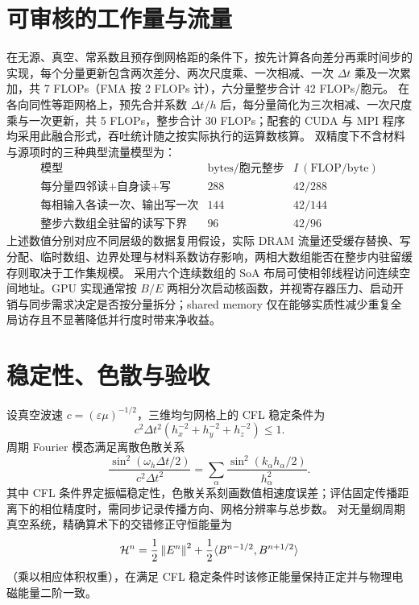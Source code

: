 \section{可审核的工作量与流量}
在无源、真空、常系数且预存倒网格距的条件下，按先计算各向差分再乘时间步的实现，每个分量更新包含两次差分、两次尺度乘、一次相减、一次 $\Delta t$ 乘及一次累加，共 7 FLOPs（FMA 按 2 FLOPs 计），六分量整步合计 42 FLOPs/胞元。
在各向同性等距网格上，预先合并系数 $\Delta t/h$ 后，每分量简化为三次相减、一次尺度乘与一次更新，共 5 FLOPs，整步合计 30 FLOPs；配套的 CUDA 与 MPI 程序均采用此融合形式，吞吐统计随之按实际执行的运算数核算。
双精度下不含材料与源项时的三种典型流量模型为：
\[
\begin{array}{l|r|r}
\text{模型}&\text{bytes/胞元整步}&I\ (\text{FLOP/byte})\\\hline
\text{每分量四邻读+自身读+写}&288&42/288\\
\text{每相输入各读一次、输出写一次}&144&42/144\\
\text{整步六数组全驻留的读写下界}&96&42/96
\end{array}
\]
上述数值分别对应不同层级的数据复用假设，实际 DRAM 流量还受缓存替换、写分配、临时数组、边界处理与材料系数访存影响，两相大数组能否在整步内驻留缓存则取决于工作集规模。
采用六个连续数组的 SoA 布局可使相邻线程访问连续空间地址。GPU 实现通常按 $B/E$ 两相分次启动核函数，并视寄存器压力、启动开销与同步需求决定是否按分量拆分；shared memory 仅在能够实质性减少重复全局访存且不显著降低并行度时带来净收益。
\section{稳定性、色散与验收}
设真空波速 $c=(\varepsilon\mu)^{-1/2}$，三维均匀网格上的 CFL 稳定条件为
\[
 c^2\Delta t^2(h_x^{-2}+h_y^{-2}+h_z^{-2})\le1.
\]
周期 Fourier 模态满足离散色散关系
\[
 \frac{\sin^2(\omega_h\Delta t/2)}{c^2\Delta t^2}
 =\sum_\alpha\frac{\sin^2(k_\alpha h_\alpha/2)}{h_\alpha^2}.
\]
其中 CFL 条件界定振幅稳定性，色散关系刻画数值相速度误差；评估固定传播距离下的相位精度时，需同步记录传播方向、网格分辨率与总步数。
对无量纲周期真空系统，精确算术下的交错修正守恒能量为
\[
 {\cal H}^n=\frac12\left\lVert E^n\right\rVert^2+
 \frac12\langle B^{n-1/2},B^{n+1/2}\rangle
\]
（乘以相应体积权重），在满足 CFL 稳定条件时该修正能量保持正定并与物理电磁能量二阶一致。
